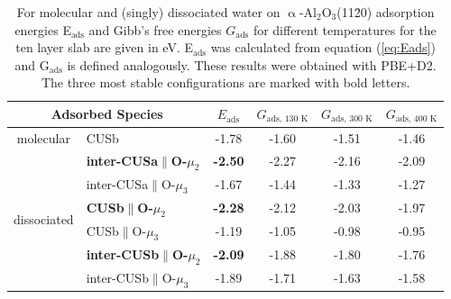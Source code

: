 \documentclass[11pt,DIV=13,BCOR=5mm,a4paper,headinclude]{scrbook}
\begin{document}
\begin{table}[!ht]
  \centering
 \caption{For molecular and (singly) dissociated water on $\upalpha$-Al$_2$O$_3$(11\=20) adsorption energies E$_\textrm{ads}$ and Gibb's free energies $G_\textrm{ads}$ for different temperatures for the ten layer slab are given in eV.
E$_\textrm{ads}$ was calculated from equation (\ref{eq:Eads}) and G$_\textrm{ads}$ is defined analogously.
These results were obtained with PBE+D2.
The three most stable configurations are marked with bold letters.
\vspace*{.2cm} 
  }
  \begin{tabular}{cl|cccc}
  \toprule
   \multicolumn{2}{c|}{Adsorbed Species}  & $E_\text{ads}$ & $G_\text{ads, 130 K}$  &  $G_\text{ads, 300 K}$  & $G_\text{ads, 400 K}$ \\\midrule
\multirow{1}{*}{molecular} & CUSb          &   -1.78  &-1.60 & -1.51  & -1.46 \\\hline
 \multirow{6}{*}{dissociated} & \textbf{inter-CUSa$\parallel$O-$\mu_2$} & \textbf{-2.50} &-2.27 & -2.16 & -2.09 \\
  & inter-CUSa$\parallel$O-$\mu_3$ & -1.67 &-1.44 &-1.33 & -1.27 \\
  & \textbf{CUSb$\parallel$O-$\mu_2$} & \textbf{-2.28} & -2.12& -2.03 &-1.97  \\
 & CUSb$\parallel$O-$\mu_3$ & -1.19 &-1.05 &-0.98 & -0.95 \\%
 & \textbf{inter-CUSb$\parallel$O-$\mu_2$} & \textbf{-2.09} &-1.88 &-1.80 & -1.76 \\
 & inter-CUSb$\parallel$O-$\mu_3$ & -1.89 &-1.71 & -1.63 & -1.58 \\\bottomrule
  \end{tabular}
  \label{tab:ads_1water}
\end{table}
\end{document}
